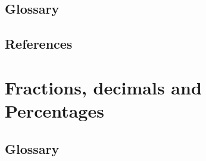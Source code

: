 \documentclass[12pt]{book}
\begin{document}






\section{Glossary}
\section{References}
\newpage

\chapter{Fractions, decimals and Percentages}%
\section{Glossary}
\end{document}
